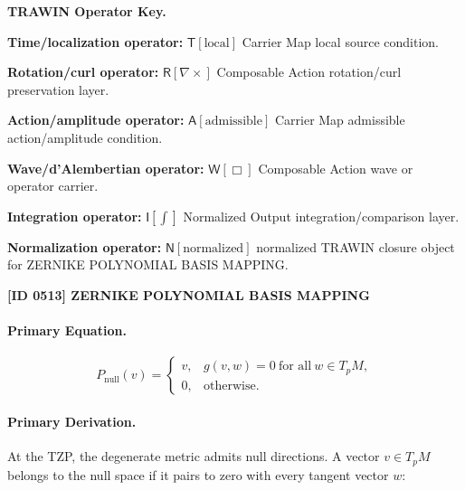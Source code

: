 \par\vspace{0.45\baselineskip}
\noindent\begin{minipage}[t]{\linewidth}
\begingroup
\small
\raggedright
\textbf{TRAWIN Operator Key.}\par
\noindent\textbf{Time/localization operator:} $\mathsf{T}\!\left[\mathrm{local}\right]$ Carrier Map local source condition.\par
\noindent\textbf{Rotation/curl operator:} $\mathsf{R}\!\left[\nabla\times\right]$ Composable Action rotation/curl preservation layer.\par
\noindent\textbf{Action/amplitude operator:} $\mathsf{A}\!\left[\mathrm{admissible}\right]$ Carrier Map admissible action/amplitude condition.\par
\noindent\textbf{Wave/d'Alembertian operator:} $\mathsf{W}\!\left[\Box\right]$ Composable Action wave or operator carrier.\par
\noindent\textbf{Integration operator:} $\mathsf{I}\!\left[\int\right]$ Normalized Output integration/comparison layer.\par
\noindent\textbf{Normalization operator:} $\mathsf{N}\!\left[\mathrm{normalized}\right]$ normalized TRAWIN closure object for ZERNIKE POLYNOMIAL BASIS MAPPING.\par
\endgroup
\end{minipage}

\clearpage
\noindent\textbf{[ID 0513] ZERNIKE POLYNOMIAL BASIS MAPPING}\par
\vspace{0.35em}
\paragraph{Primary Equation.}
\begin{equation}
P_{\mathrm{null}}(v)
=
\begin{cases}
v, & g(v,w)=0\ \text{for all}\ w\in T_pM,\\
0, & \text{otherwise}.
\end{cases}
\end{equation}

\paragraph{Primary Derivation.}
At the TZP, the degenerate metric admits null directions.  
A vector $v\in T_pM$ belongs to the null space if it pairs to zero with every tangent vector $w$:

